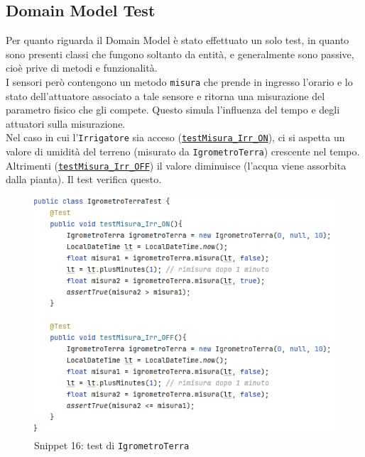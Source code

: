 \documentclass{article}
\newcommand{\code}[1]{\texttt{#1}}
\begin{document}
\subsection{Domain Model Test}
Per quanto riguarda il Domain Model è stato effettuato un solo test, in quanto sono presenti classi che fungono soltanto da entità, e generalmente sono passive, cioè prive di metodi e funzionalità.\\
I sensori però contengono un metodo \code{misura} che prende in ingresso l'orario e lo stato dell'attuatore associato a tale sensore e ritorna una misurazione del parametro fisico che gli compete. Questo simula l'influenza del tempo e degli attuatori sulla misurazione.\\
Nel caso in cui l'\code{Irrigatore} sia acceso (\hyperref[fig:snippet_IgrometroTerraTest]{\code{testMisura\_Irr\_ON}}), ci si aspetta un valore di umidità del terreno (misurato da \code{IgrometroTerra}) crescente nel tempo. Altrimenti (\hyperref[fig:snippet_IgrometroTerraTest]{\code{testMisura\_Irr\_OFF}}) il valore diminuisce (l'acqua viene assorbita dalla pianta). Il test verifica questo.

\begin{figure}[H]
    \centering
    \includegraphics[scale=0.5]{resources/images/Snippets/snippet_IgrometroTerraTest.png}
    \captionsetup{labelformat=empty,labelsep=none}
    \caption{Snippet 16: test di \code{IgrometroTerra}}
    \label{fig:snippet_IgrometroTerraTest}
\end{figure}
\end{document}

